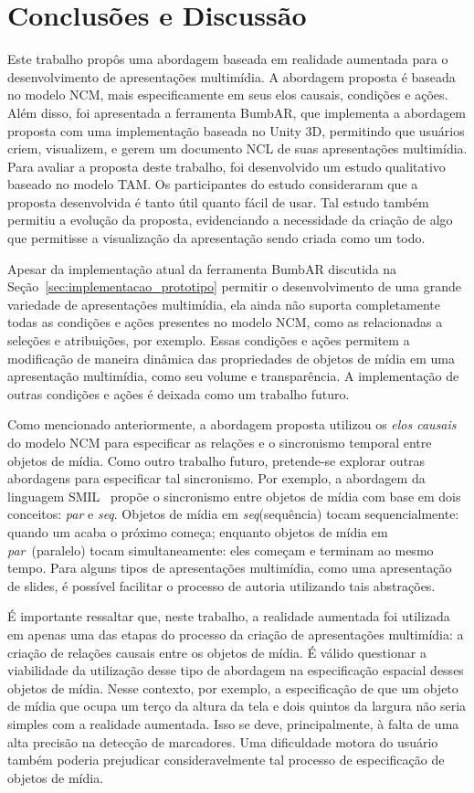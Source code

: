 \documentclass[../main.tex]{subfiles}
\begin{document}
\chapter{Conclusões e Discussão}\label{cap:conclusoes}

Este trabalho propôs uma abordagem baseada em realidade aumentada para o desenvolvimento de apresentações multimídia. A abordagem proposta é baseada no modelo NCM, mais especificamente em seus elos causais, condições e ações. Além disso, foi apresentada a ferramenta BumbAR, que implementa a abordagem proposta com uma implementação baseada no Unity 3D, permitindo que usuários criem, visualizem, e gerem um documento NCL de suas apresentações multimídia. Para avaliar a proposta deste trabalho, foi desenvolvido um estudo qualitativo baseado no modelo TAM. Os participantes do estudo consideraram que a proposta desenvolvida é tanto útil quanto fácil de usar. Tal estudo também permitiu a evolução da proposta, evidenciando a necessidade da criação de algo que permitisse a visualização da apresentação sendo criada como um todo.

Apesar da implementação atual da ferramenta BumbAR discutida na Seção~\ref{sec:implementacao_prototipo} permitir o desenvolvimento de uma grande variedade de apresentações multimídia, ela ainda não suporta completamente todas as condições e ações presentes no modelo NCM, como as relacionadas a seleções e atribuições, por exemplo. Essas condições e ações permitem a modificação de maneira dinâmica das propriedades de objetos de mídia em uma apresentação multimídia, como seu volume e transparência. A implementação de outras condições e ações é deixada como um trabalho futuro.

Como mencionado anteriormente, a abordagem proposta utilizou os \emph{elos causais} do modelo NCM para especificar as relações e o sincronismo temporal entre objetos de mídia. Como outro trabalho futuro, pretende-se explorar outras abordagens para especificar tal sincronismo. Por exemplo, a abordagem da linguagem SMIL~\cite{rutledge2001smil} propõe o sincronismo entre objetos de mídia com base em dois conceitos: \emph{par} e \emph{seq}. Objetos de mídia em \emph{seq}(sequência) tocam sequencialmente: quando um acaba o próximo começa; enquanto objetos de mídia em \emph{par}~(paralelo) tocam simultaneamente: eles começam e terminam ao mesmo tempo. Para alguns tipos de apresentações multimídia, como uma apresentação de slides, é possível facilitar o processo de autoria utilizando tais abstrações.

É importante ressaltar que, neste trabalho, a realidade aumentada foi utilizada em apenas uma das etapas do processo da criação de apresentações multimídia: a criação de relações causais entre os objetos de mídia. É válido questionar a viabilidade da utilização desse tipo de abordagem na especificação espacial desses objetos de mídia. Nesse contexto, por exemplo, a especificação de que um objeto de mídia que ocupa um terço da altura da tela e dois quintos da largura não seria simples com a realidade aumentada. Isso se deve, principalmente, à falta de uma alta precisão na detecção de marcadores. Uma dificuldade motora do usuário também poderia prejudicar consideravelmente tal processo de especificação de objetos de mídia. 
\end{document}
